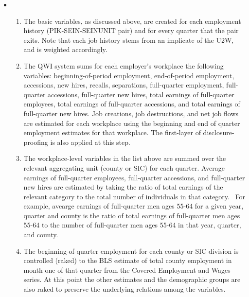 \begin{itemize}
\item[\ ] 

\begin{enumerate}
\item The basic variables, as discussed above, are created for each
employment history (PIK-SEIN-SEINUNIT pair) and for every quarter
that the pair exits. Note that each job history stems from an implicate of
the U2W, and
is weighted accordingly. 


\item The QWI system sums for each employer's workplace the following variables:
beginning-of-period employment, end-of-period employment, accessions, new
hires, recalls, separations, full-quarter employment, full-quarter
accessions, full-quarter new hires, total earnings of full-quarter
employees, total earnings of full-quarter accessions, and total earnings of
full-quarter new hires. Job creations, job destructions, and net job flows
are estimated for each workplace using the beginning and end of quarter
employment estimates for that workplace. The first-layer of
disclosure-proofing is also applied at this step.

\item The workplace-level variables in the list above are summed over the
relevant aggregating unit (county or SIC) for each quarter. Average
earnings of full-quarter employees, full-quarter accessions, and
full-quarter new hires are estimated by taking the ratio of total earnings
of the relevant category to the total number of individuals in that
category. \ For example, avearge earnings of full-quarter men ages 55-64 for
a given year, quarter and county is the ratio of total earnings of
full-quarter men ages 55-64 to the number of full-quarter men ages 55-64 in
that year, quarter, and county.

\item The beginning-of-quarter employment for each county or SIC division is
controlled (raked) to the BLS estimate of total county employment in month
one of that quarter from the Covered Employment and Wages series. At this
point the other estimates and the demographic groups are also raked to
preserve the underlying relations among the variables.
\end{enumerate}
\end{itemize}

%
%
%



